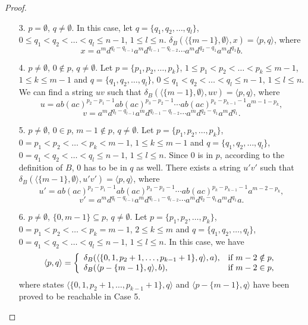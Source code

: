 \documentclass[10pt]{article}
\begin{document}
\begin{proof}
\begin{itemize}
\item[{\rm 3.}]$p= \emptyset$, $q\neq \emptyset$.
In this case, let $q=\{ q_1, q_2, \ldots ,q_l \}$, $0\leq q_1<q_2<
\ldots <q_l \leq n-1$, $1\leq l\leq n$. $\delta_B(\langle
\{m-1\},\emptyset \rangle, x) = \langle p,q\rangle$, where
$$x = a^md^{q_l-q_{l-1}}a^md^{q_{l-1}-q_{l-2}}\cdots a^md^{q_2-q_1}a^md^{q_1}b.$$

\item[{\rm 4.}]$p\neq \emptyset$, $0\notin p$, $q\neq \emptyset$.
Let $p=\{ p_1, p_2, \ldots ,p_k \}$, $1\leq p_1<p_2< \ldots <p_k
\leq m-1$, $1\leq k\leq m-1$ and $q=\{ q_1, q_2, \ldots ,q_l \}$,
$0\leq q_1<q_2< \ldots <q_l \leq n-1$, $1\leq l\leq n$. We can find
a string $uv$ such that $\delta_B(\langle \{m-1\},\emptyset \rangle,
uv) = \langle p,q\rangle$, where
$$u = ab(ac)^{p_2-p_1-1}ab(ac)^{p_{3}-p_{2}-1}\cdots ab(ac)^{p_k-p_{k-1}-1}a^{m-1-p_k},$$
$$v = a^md^{q_l-q_{l-1}}a^md^{q_{l-1}-q_{l-2}}\cdots a^md^{q_2-q_1}a^md^{q_1}.$$

\item[{\rm 5.}]$p\neq \emptyset$, $0\in p$, $m-1\notin p$, $q\neq \emptyset$.
Let $p=\{ p_1, p_2, \ldots ,p_k \}$, $0= p_1<p_2< \ldots <p_k <m-1$,
$1\leq k\leq m-1$ and $q=\{ q_1, q_2, \ldots ,q_l \}$, $0= q_1<q_2<
\ldots <q_l \leq n-1$, $1\leq l\leq n$. Since $0$ is in $p$,
according to the definition of $B$, $0$ has to be in $q$ as well.
There exists a string $u'v'$ such that $\delta_B(\langle
\{m-1\},\emptyset \rangle, u'v') = \langle p,q\rangle$, where
$$u' = ab(ac)^{p_2-p_1-1}ab(ac)^{p_{3}-p_{2}-1}\cdots ab(ac)^{p_k-p_{k-1}-1}a^{m-2-p_k},$$
$$v' = a^md^{q_l-q_{l-1}}a^md^{q_{l-1}-q_{l-2}}\cdots a^md^{q_2-q_1}a^md^{q_1}a.$$

\item[{\rm 6.}]$p\neq \emptyset$, $\{0,m-1\}\subseteq p$, $q\neq \emptyset$.
Let $p=\{ p_1, p_2, \ldots ,p_k \}$, $0= p_1<p_2< \ldots <p_k =m-1$,
$2\leq k\leq m$ and $q=\{ q_1, q_2, \ldots ,q_l \}$, $0= q_1<q_2<
\ldots <q_l \leq n-1$, $1\leq l\leq n$. In this case, we have
\begin{eqnarray*}
\langle p,q\rangle = \left\{
\begin{array}{l l}
  \delta_B(\langle \{0,1,p_2+1,\ldots,p_{k-1}+1\} , q \rangle, a), & \mbox{if }m-2\notin p,\\
  \delta_B(\langle p-\{m-1\},q\rangle, b), & \mbox{if }m-2\in p,
\end{array} \right.
\end{eqnarray*}
where states $\langle \{0,1,p_2+1,\ldots,p_{k-1}+1\} , q \rangle$
and $\langle p-\{m-1\},q\rangle$ have been proved to be reachable in
Case 5.





\end{itemize}
\end{proof}
\end{document}
